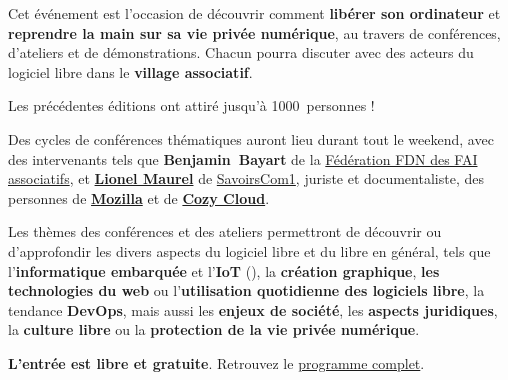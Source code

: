 
\Separateur

Cet événement est l'occasion de découvrir comment \textbf{libérer son ordinateur}
et \textbf{reprendre la main sur sa vie privée numérique},
au travers de conférences, d'ateliers et de démonstrations.
Chacun pourra discuter avec des acteurs du logiciel libre dans le \textbf{village associatif}.

Les précédentes éditions ont attiré jusqu'à \num{1000}~personnes !

\Separateur

Des cycles de conférences thématiques auront lieu durant tout le weekend,
avec des intervenants tels que \textbf{\mbox{Benjamin Bayart}} de la \href{https://ffdn.org/}{Fédération FDN des FAI associatifs},
et \textbf{\href{https://scinfolex.com/}{Lionel Maurel}} de \href{https://savoirscom1.info/}{SavoirsCom1}, juriste et documentaliste,
des personnes de \textbf{\href{https://www.mozilla.org/}{Mozilla}} et de \textbf{\href{https://cozy.io/}{Cozy Cloud}}.

\Separateur

Les thèmes des conférences et des ateliers permettront de découvrir ou d'approfondir
les divers aspects du logiciel libre et du libre en général, tels que 
l'\textbf{informatique embarquée} et l'\textbf{IoT} (), la \textbf{création graphique},
\textbf{les technologies du web} ou l'\textbf{utilisation quotidienne des logiciels libre}, la tendance \textbf{DevOps},
mais aussi les \textbf{enjeux de société}, les \textbf{aspects juridiques},
la \textbf{culture libre} ou la \textbf{protection de la vie privée numérique}.

\Separateur

\textbf{L'entrée est libre et gratuite}. Retrouvez le \href{https://2016.capitoledulibre.org/programme.html}{programme complet}.

